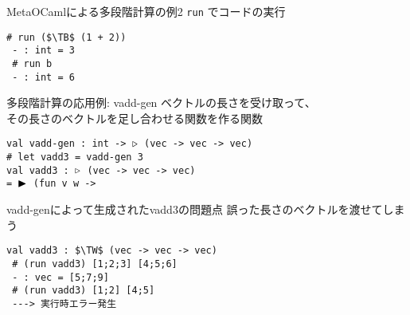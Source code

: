 \documentclass[dvipdfmx,aspectratio=169, 20pt]{beamer}
\begin{document}
\begin{frame}[fragile]{MetaOCamlによる多段階計算の例2}
    \verb|run| でコードの実行
    \begin{exampleblock}{}
        \begin{Verbatim}[commandchars=\\\{\},codes={\catcode`$=3\catcode`^=7}]
 # run ($\TB$ (1 + 2))
 - : int = 3
 # run b
 - : int = 6
        \end{Verbatim}
    \end{exampleblock}
\end{frame}

\begin{frame}[fragile]{多段階計算の応用例: vadd-gen}
    ベクトルの長さを受け取って、\\その長さのベクトルを足し合わせる関数を作る関数
    \begin{exampleblock}{}
        \hspace{5mm} {\tt val vadd-gen : int -> ${\mathop{\triangleright}}$ (vec -> vec -> vec)} \\
        \hspace{5mm} {\tt \# let vadd3 = vadd-gen 3} \\
        \hspace{5mm} {\tt val vadd3 : ${\mathop{\triangleright}}$ (vec -> vec -> vec)} \\
        \hspace{20mm} {\tt = ${\mathop{\blacktriangleright}}$ (fun v w -> } \\
        \hspace{25mm} 
    \end{exampleblock}
\end{frame}

\begin{frame}[fragile]{vadd-genによって生成されたvadd3の問題点}
    誤った長さのベクトルを渡せてしまう
    \begin{exampleblock}{}
        \begin{Verbatim}[commandchars=\\\{\},codes={\catcode`$=3\catcode`^=7}]
 val vadd3 : $\TW$ (vec -> vec -> vec)
 # (run vadd3) [1;2;3] [4;5;6]
 - : vec = [5;7;9]
 # (run vadd3) [1;2] [4;5]
 ---> 実行時エラー発生
    \end{Verbatim}
    \end{exampleblock}
\end{frame}
\end{document}
